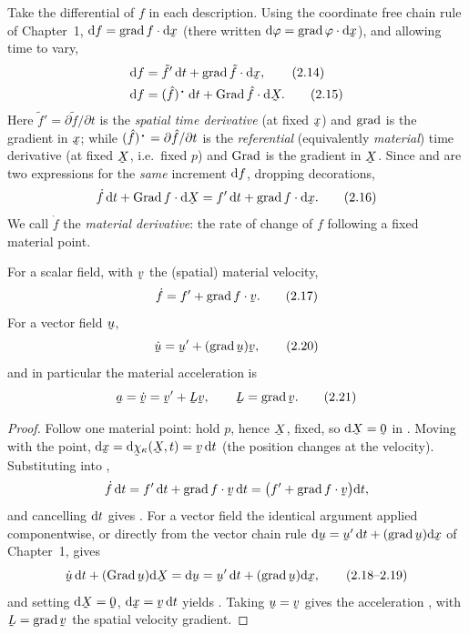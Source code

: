 Take the differential of $f$ in each description. Using the coordinate free
chain rule of Chapter~1, $\dl f=\ip{\grad f}{\dl\bx}$ (there written
$\dl\varphi=\ip{\grad\varphi}{\dl\bx}$), and allowing time to vary,
\begin{align}
   \dl f&=\tilde f'\,\dl t+\ip{\grad\tilde f}{\dl\bx}, \tag{2.14}\label{eq:2.14}\\
   \dl f&=(\hat f)^{\hbox{\tiny\textbullet}}\,\dl t+\ip{\Grad\hat f}{\dl\bX}. \tag{2.15}\label{eq:2.15}
\end{align}
Here $\tilde f'=\partial\tilde f/\partial t$ is the \emph{spatial time
derivative} (at fixed $\bx$) and $\operatorname{grad}$ is the gradient in $\bx$; while
$(\hat f)^{\hbox{\tiny\textbullet}}=\partial\hat f/\partial t$ is the
\emph{referential} (equivalently \emph{material}) time derivative (at fixed
$\bX$, i.e.\ fixed $p$) and $\operatorname{Grad}$ is the gradient in $\bX$. Since 
and  are two expressions for the \emph{same} increment $\mathrm{d} f$,
dropping decorations,
\begin{equation}
   \dot f\,\dl t+\ip{\Grad f}{\dl\bX}=f'\,\dl t+\ip{\grad f}{\dl\bx}. \tag{2.16}\label{eq:2.16}
\end{equation}
We call $\dot f$ the \emph{material derivative}: the rate of change of $f$
following a fixed material point.

\begin{theorem}\label{thm:matder}
For a scalar field, with $\bv$ the (spatial) material velocity,
\begin{equation}
   \dot f=f'+\ip{\grad f}{\bv}. \tag{2.17}\label{eq:2.17}
\end{equation}
For a vector field $\bu$,
\begin{equation}
   \dot\bu=\bu'+(\grad\bu)\bv, \tag{2.20}\label{eq:2.20}
\end{equation}
and in particular the material acceleration is
\begin{equation}
   \ba=\dot\bv=\bv'+\bL\bv,\qquad \bL=\grad\bv. \tag{2.21}\label{eq:2.21}
\end{equation}
\end{theorem}

\begin{proof}
Follow one material point: hold $p$, hence $\bX$, fixed, so $\dl\bX=\bze$ in
. Moving with the point, $\dl\bx=\dl\bchi_\kappa(\bX,t)=\bv\,\dl t$
(the position changes at the velocity). Substituting into ,
\[
   \dot f\,\dl t=f'\,\dl t+\ip{\grad f}{\bv\,\dl t}
   =\big(f'+\ip{\grad f}{\bv}\big)\dl t,
\]
and cancelling $\mathrm{d} t$ gives . For a vector field the identical
argument applied componentwise, or directly from the vector chain rule
$\dl\bu=\bu'\,\dl t+(\grad\bu)\dl\bx$ of Chapter~1, gives
\begin{equation}
   \dot\bu\,\dl t+(\Grad\bu)\dl\bX=\dl\bu=\bu'\,\dl t+(\grad\bu)\dl\bx,
   \tag{2.18--2.19}\label{eq:2.18}
\end{equation}
and setting $\dl\bX=\bze$, $\dl\bx=\bv\,\dl t$ yields . Taking
$\bu=\bv$ gives the acceleration , with $\bL=\grad\bv$ the spatial
velocity gradient.
\end{proof}

